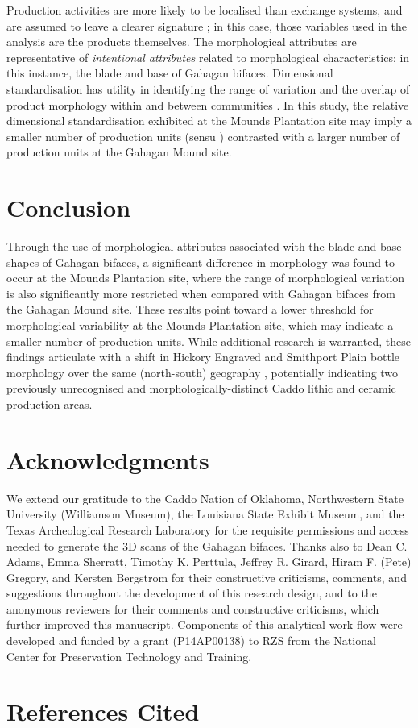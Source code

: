 \documentclass[review]{elsarticle}
\begin{document}
Production activities are more likely to be localised than exchange systems, and are assumed to leave a clearer signature \citep{RN29}; in this case, those variables used in the analysis are the products themselves. The morphological attributes are representative of \textit{intentional attributes} \citep{RN250} related to morphological characteristics; in this instance, the blade and base of Gahagan bifaces. Dimensional standardisation has utility in identifying the range of variation and the overlap of product morphology within and between communities \citep{RN5897}. In this study, the relative dimensional standardisation exhibited at the Mounds Plantation site may imply a smaller number of production units (sensu \citet{RN29}) contrasted with a larger number of production units at the Gahagan Mound site. 

\section{Conclusion}

Through the use of morphological attributes associated with the blade and base shapes of Gahagan bifaces, a significant difference in morphology was found to occur at the Mounds Plantation site, where the range of morphological variation is also significantly more restricted when compared with Gahagan bifaces from the Gahagan Mound site. These results point toward a lower threshold for morphological variability at the Mounds Plantation site, which may indicate a smaller number of production units. While additional research is warranted, these findings articulate with a shift in Hickory Engraved and Smithport Plain bottle morphology over the same (north-south) geography \citep{RN11801,RN11716}, potentially indicating two previously unrecognised and morphologically-distinct Caddo lithic and ceramic production areas. 

\section*{Acknowledgments}

We extend our gratitude to the Caddo Nation of Oklahoma, Northwestern State University (Williamson Museum), the Louisiana State Exhibit Museum, and the Texas Archeological Research Laboratory for the requisite permissions and access needed to generate the 3D scans of the Gahagan bifaces. Thanks also to Dean C. Adams, Emma Sherratt, Timothy K. Perttula, Jeffrey R. Girard, Hiram F. (Pete) Gregory, and Kersten Bergstrom for their constructive criticisms, comments, and suggestions throughout the development of this research design, and to the anonymous reviewers for their comments and constructive criticisms, which further improved this manuscript. Components of this analytical work flow were developed and funded by a grant (P14AP00138) to RZS from the National Center for Preservation Technology and Training.

\section*{References Cited}


\end{document}
